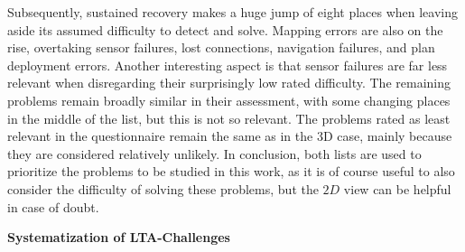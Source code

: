 \documentclass[english, master, utf8]{base/thesis_KBS}
\begin{document}
Subsequently, sustained recovery makes a huge jump of eight places when leaving aside its assumed difficulty to detect and solve.
Mapping errors are also on the rise, overtaking sensor failures, lost connections, navigation failures, and plan deployment errors.
Another interesting aspect is that sensor failures are far less relevant when disregarding their surprisingly low rated difficulty.
The remaining problems remain broadly similar in their assessment, with some changing places in the middle of the list, but this is not so relevant.
The problems rated as least relevant in the questionnaire remain the same as in the 3D case, mainly because they are considered relatively unlikely.
In conclusion, both lists are used to prioritize the problems to be studied in this work, as it is of course useful to also consider the difficulty of 
solving these problems, but the $2D$ view can be helpful in case of doubt.

\pagebreak

\noindent
\textbf{Systematization of LTA-Challenges}\newline
\end{document}
